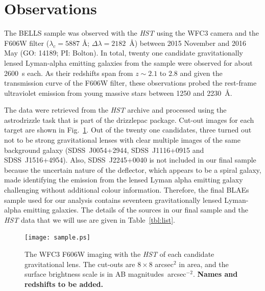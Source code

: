 \documentclass[a4paper,fleqn,usenatbib]{mnras}
\begin{document}
\section{Observations}
\label{sec:obs}

The BELLS sample was observed with the {\it HST} using the WFC3 camera and the F606W filter ($\lambda_c = 5887$ \AA; $\Delta\lambda = 2182$~\AA) between 2015 November and 2016 May (GO: 14189; PI: Bolton). In total, twenty one candidate gravitationally lensed Lyman-alpha emitting galaxies from the \citet{Shu16} sample were observed for about 2600~s each. As their redshifts span from $z \sim 2.1$ to 2.8 and given the transmission curve of the F606W filter, these observations probed the rest-frame ultraviolet emission from young massive stars between 1250 and 2230~\AA.

The data were retrieved from the {\it HST} archive and processed using the {\sc astrodrizzle} task that is part of the {\sc drizzlepac} package. Cut-out images for each target are shown in Fig.~\ref{fig:sample}. Out of the twenty one candidates, three turned out not to be strong gravitational lenses with clear multiple images of the same background galaxy (SDSS~J0054+2944, SDSS~J1116+0915 and SDSS~J1516+4954). Also, SDSS~J2245+0040 is not included in our final sample because the uncertain nature of the deflector, which appears to be a spiral galaxy, made identifying the emission from the lensed Lyman alpha emitting galaxy challenging without additional colour information. Therefore, the final BLAEs sample used for our analysis contains seventeen gravitationally lensed Lyman-alpha emitting galaxies. The details of the sources in our final sample and the {\it HST} data that we will use are given in Table~\ref{tbl:list}.

\begin{figure}
\begin{center} 
\texttt{[image: sample.ps]}
\caption{The WFC3 F606W imaging with the {\it HST} of each candidate gravitational lens. The cut-outs are $8\times8$ arcsec$^2$ in area, and the surface brightness scale is in AB magnitudes~arcsec$^{-2}$. {\bf Names and redshifts to be added.}}
\label{fig:sample}
\end{center}     
 \end{figure}
\end{document}
